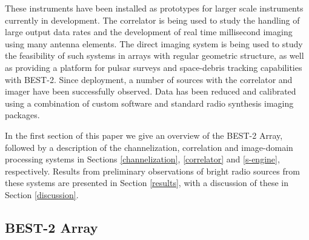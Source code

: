 \documentclass[useAMS,macros,usenatbib,onecolumn]{mn2e}
\begin{document}
These instruments have been installed as prototypes for larger scale instruments currently in development.
The correlator is being used to study the handling of large output data rates and the development of real time millisecond imaging using many antenna elements.
The direct imaging system is being used to study the feasibility of such systems in arrays with regular geometric structure, as well as providing a platform for pulsar surveys and space-debris tracking capabilities with BEST-2.
Since deployment, a number of sources with the correlator and imager have been successfully observed.
Data has been reduced and calibrated using a combination of custom software and standard radio synthesis imaging packages.

In the first section of this paper we give an overview of the BEST-2 Array, followed by a description of the channelization, correlation and image-domain processing systems in Sections \ref{channelization}, \ref{correlator} and \ref{s-engine}, respectively. Results from preliminary observations of bright radio sources from these systems are presented in Section \ref{results}, with a discussion of these in Section \ref{discussion}.

\subsection{BEST-2 Array}
\label{best-2 array}
\end{document}
